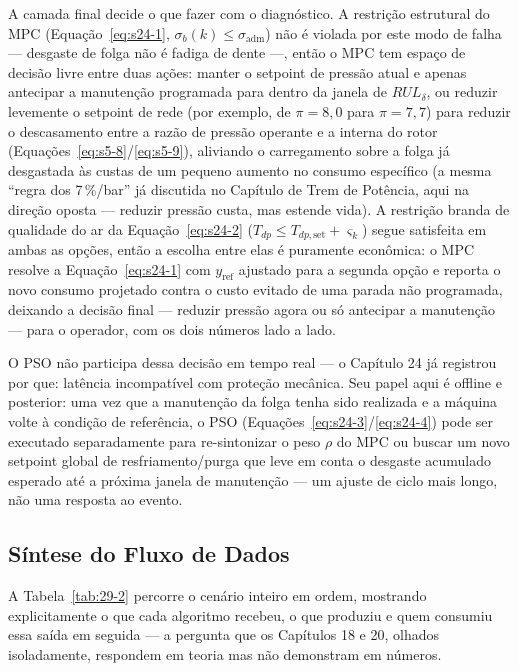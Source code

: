 \documentclass[12pt,a4paper]{article}
\numberwithin{equation}{section}
\numberwithin{table}{section}
\numberwithin{figure}{section}
\begin{document}
A camada final decide o que fazer com o diagnóstico. A restrição estrutural do MPC (Equação~\eqref{eq:s24-1}, $\sigma_b(k) \le \sigma_{\text{adm}}$) não é violada por este modo de falha — desgaste de folga não é fadiga de dente —, então o MPC tem espaço de decisão livre entre duas ações: manter o setpoint de pressão atual e apenas antecipar a manutenção programada para dentro da janela de $RUL_\delta$, ou reduzir levemente o setpoint de rede (por exemplo, de $\pi = 8{,}0$ para $\pi = 7{,}7$) para reduzir o descasamento entre a razão de pressão operante e a interna do rotor (Equações~\eqref{eq:s5-8}/\eqref{eq:s5-9}), aliviando o carregamento sobre a folga já desgastada às custas de um pequeno aumento no consumo específico (a mesma ``regra dos 7\,\%/bar'' já discutida no Capítulo de Trem de Potência, aqui na direção oposta — reduzir pressão custa, mas estende vida). A restrição branda de qualidade do ar da Equação~\eqref{eq:s24-2} ($T_{dp} \le T_{dp,\text{set}} + \varsigma_k$) segue satisfeita em ambas as opções, então a escolha entre elas é puramente econômica: o MPC resolve a Equação~\eqref{eq:s24-1} com $y_{\text{ref}}$ ajustado para a segunda opção e reporta o novo consumo projetado contra o custo evitado de uma parada não programada, deixando a decisão final — reduzir pressão agora ou só antecipar a manutenção — para o operador, com os dois números lado a lado.

O PSO não participa dessa decisão em tempo real — o Capítulo 24 já registrou por que: latência incompatível com proteção mecânica. Seu papel aqui é offline e posterior: uma vez que a manutenção da folga tenha sido realizada e a máquina volte à condição de referência, o PSO (Equações~\eqref{eq:s24-3}/\eqref{eq:s24-4}) pode ser executado separadamente para re-sintonizar o peso $\rho$ do MPC ou buscar um novo setpoint global de resfriamento/purga que leve em conta o desgaste acumulado esperado até a próxima janela de manutenção — um ajuste de ciclo mais longo, não uma resposta ao evento.

\subsection{Síntese do Fluxo de Dados}

A Tabela~\ref{tab:29-2} percorre o cenário inteiro em ordem, mostrando explicitamente o que cada algoritmo recebeu, o que produziu e quem consumiu essa saída em seguida — a pergunta que os Capítulos 18 e 20, olhados isoladamente, respondem em teoria mas não demonstram em números.
\end{document}
